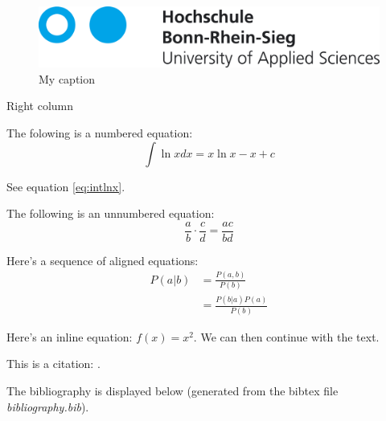 \documentclass{article}
\begin{document}
    \begin{minipage}{0.45\textwidth}
        \begin{figure}[H]
            \centering
            \includegraphics[width=0.8\linewidth]{hbrs_logo.png}
            \caption{My caption}
            \label{fig:mycaption2}
        \end{figure}
    \end{minipage}
    \begin{minipage}{0.45\textwidth}
        Right column
    \end{minipage}

    \newpage

    The folowing is a numbered equation:
    \begin{equation}
        \int{\ln xdx} = x\ln x - x + c
        \label{eq:intlnx}
    \end{equation}

    See equation \ref{eq:intlnx}.

    The following is an unnumbered equation:
    \begin{equation*}
        \frac{a}{b} \cdot \frac{c}{d} = \frac{ac}{bd}
    \end{equation*}

    Here's a sequence of aligned equations:
    \begin{align}
        P(a|b) &= \frac{P(a, b)}{P(b)} \\
               &= \frac{P(b|a)P(a)}{P(b)}
    \end{align}

    Here's an inline equation: $f(x) = x^2$. We can then continue with the text.

    This is a citation: \cite{mycitation}.

    The bibliography is displayed below (generated from the bibtex file \emph{bibliography.bib}).

    
    
\end{document}
